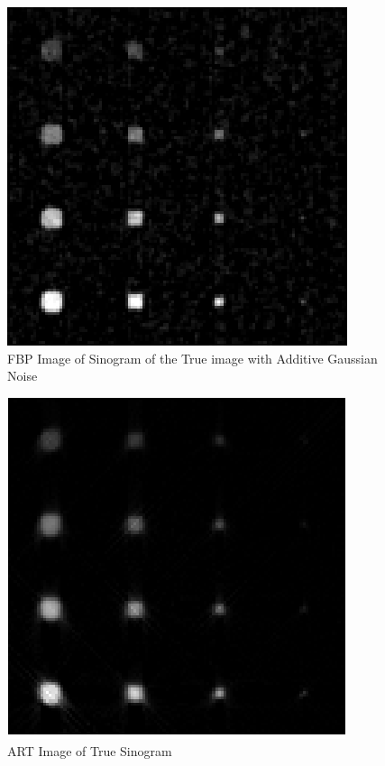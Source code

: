 \documentclass{article}
\begin{document}
\newpage
\begin{figure}[h]
  \includegraphics[width=\linewidth]{FBP3.png}
  \caption{FBP Image of Sinogram of the True image with Additive Gaussian Noise}\label{fbp3}
\end{figure}


\newpage
\begin{figure}[h]
\centering
  \includegraphics{ART1.png}
  \caption{ART Image of True Sinogram}\label{fbp1}
\end{figure}
\end{document}
